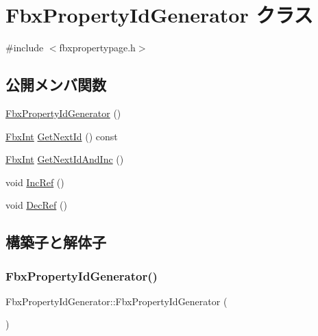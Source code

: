 \hypertarget{class_fbx_property_id_generator}{}\section{Fbx\+Property\+Id\+Generator クラス}
\label{class_fbx_property_id_generator}


{\ttfamily \#include $<$fbxpropertypage.\+h$>$}

\subsection*{公開メンバ関数}
\begin{DoxyCompactItemize}
\item 
\hyperlink{class_fbx_property_id_generator_ad86e7c1dcd8a4bc039accf8c4993938a}{Fbx\+Property\+Id\+Generator} ()
\item 
\hyperlink{fbxtypes_8h_a088fa96de3b0b3ea69f0f6afef525dfb}{Fbx\+Int} \hyperlink{class_fbx_property_id_generator_a39bb3de3a2a11a1a281ee1e98a0035db}{Get\+Next\+Id} () const
\item 
\hyperlink{fbxtypes_8h_a088fa96de3b0b3ea69f0f6afef525dfb}{Fbx\+Int} \hyperlink{class_fbx_property_id_generator_a77a349020d3d25a78b19131b2c62aaa9}{Get\+Next\+Id\+And\+Inc} ()
\item 
void \hyperlink{class_fbx_property_id_generator_ac1834015b7a1fa1fe47ebf93737b03e0}{Inc\+Ref} ()
\item 
void \hyperlink{class_fbx_property_id_generator_a64a7faa5d20848c3d8817a6c01ed0298}{Dec\+Ref} ()
\end{DoxyCompactItemize}


\subsection{構築子と解体子}
\mbox{\label{class_fbx_property_id_generator_ad86e7c1dcd8a4bc039accf8c4993938a}} 
\subsubsection{\texorpdfstring{Fbx\+Property\+Id\+Generator()}{FbxPropertyIdGenerator()}}
{\footnotesize\ttfamily Fbx\+Property\+Id\+Generator\+::\+Fbx\+Property\+Id\+Generator (\begin{DoxyParamCaption}{ }\end{DoxyParamCaption})}



